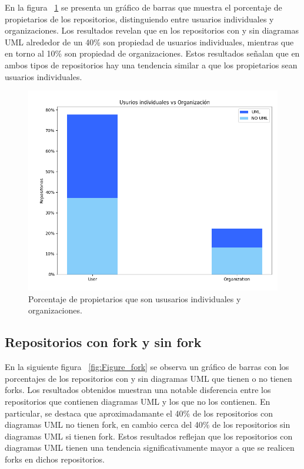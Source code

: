 \documentclass[a4paper, 12pt]{book}
\begin{document}
En la figura ~\ref{fig:Figure_typeDeveloper} se presenta un gráfico de barras que muestra el porcentaje de propietarios de los repositorios, distinguiendo entre usuarios individuales y organizaciones. 
Los resultados revelan que en los repositorios con y sin diagramas UML alrededor de un 40\% son propiedad de usuarios individuales, mientras que en torno al 10\% son propiedad de organizaciones.
Estos resultados señalan que en ambos tipos de repositorios hay una tendencia similar a que los propietarios sean usuarios individuales.


\begin{figure}
  \centering
  \includegraphics[width=12cm, keepaspectratio]{img/Figure_typeDeveloper.png}
  \caption{Porcentaje de propietarios que son ususarios individuales y organizaciones.}\label{fig:Figure_typeDeveloper}
\end{figure}


\subsection{Repositorios con fork y sin fork}
\label{sec:Gráfico de barras de los repositorios con fork y sin forks}
En la siguiente figura ~\ref{fig:Figure_fork} se observa un gráfico de barras con los porcentajes de  los repositorios con y sin diagramas UML que tienen o no tienen forks.
Los resultados obtenidos muestran una notable disferencia entre los repositorios que contienen diagramas UML y los que no los contienen.
En particular, se destaca que aproximadamante el 40\% de los repositorios con diagramas UML no tienen fork, en cambio cerca del 40\% de los repositorios sin diagramas UML si tienen fork.
Estos resultados reflejan que los repositorios con diagramas UML tienen una tendencia significativamente mayor a que se realicen forks en dichos repositorios.
\end{document}
